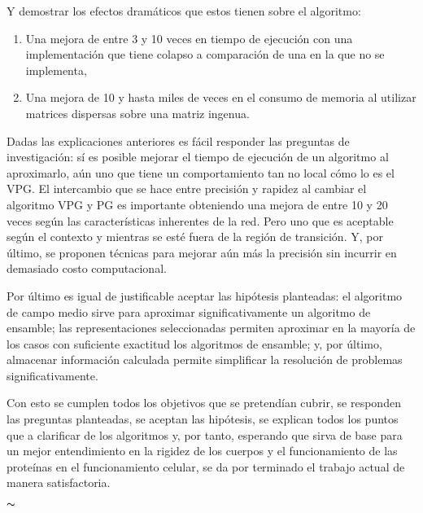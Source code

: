 Y demostrar los efectos dramáticos que estos tienen sobre el algoritmo:

\begin{enumerate}
	\item Una mejora de entre 3 y 10 veces en tiempo de ejecución con una implementación que tiene colapso a comparación de una en la que no se implementa,
	\item Una mejora de 10 y hasta miles de veces en el consumo de memoria al utilizar matrices dispersas sobre una matriz ingenua.
\end{enumerate}

Dadas las explicaciones anteriores es fácil responder las preguntas de investigación: sí es posible mejorar el tiempo de ejecución de un algoritmo al aproximarlo, aún uno que tiene un comportamiento tan no local cómo lo es el VPG. El intercambio que se hace entre precisión y rapidez al cambiar el algoritmo VPG y PG es importante obteniendo una mejora de entre 10 y 20 veces según las características inherentes de la red. Pero uno que es aceptable según el contexto y mientras se esté fuera de la región de transición. Y, por último, se proponen técnicas para mejorar aún más la precisión sin incurrir en demasiado costo computacional.

Por último es igual de justificable aceptar las hipótesis planteadas: el algoritmo de campo medio sirve para aproximar significativamente un algoritmo de ensamble; las representaciones seleccionadas permiten aproximar en la mayoría de los casos con suficiente exactitud los algoritmos de ensamble; y, por último, almacenar información calculada permite simplificar la resolución de problemas significativamente.

Con esto se cumplen todos los objetivos que se pretendían cubrir, se responden las preguntas planteadas, se aceptan las hipótesis, se explican todos los puntos que a clarificar de los algoritmos y, por tanto, esperando que sirva de base para un mejor entendimiento en la rigidez de los cuerpos y el funcionamiento de las proteínas en el funcionamiento celular, se da por terminado el trabajo actual de manera satisfactoria. 

{ \huge \hfill $\thicksim$ \hfill }
